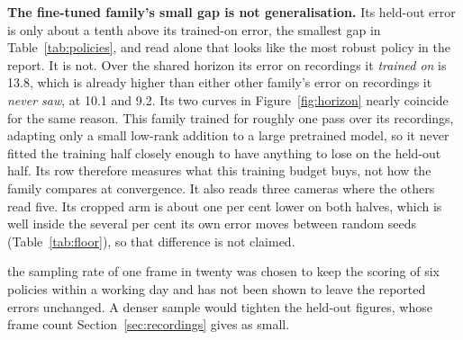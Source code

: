 \textbf{The fine-tuned family's small gap is not generalisation.} Its held-out
error is only about a tenth above its trained-on error, the smallest gap in
Table~\ref{tab:policies}, and read alone that looks like the most robust policy
in the report. It is not. Over the shared horizon its error on recordings it
\emph{trained on} is \num{13.8}, which is already higher than either other
family's error on recordings it \emph{never saw}, at \num{10.1} and \num{9.2}.
Its two curves in Figure~\ref{fig:horizon} nearly coincide for the same reason.
This family trained for roughly one pass over its recordings, adapting only a
small low-rank addition to a large pretrained model, so it never fitted the
training half closely enough to have anything to lose on the held-out half. Its
row therefore measures what this training budget buys, not how the family
compares at convergence. It also reads three cameras where the others read
five. Its cropped arm is about one per cent lower on both halves, which is
well inside the several per cent its own error moves between random seeds
(Table~\ref{tab:floor}), so that difference is not claimed.

\unjustified{} the sampling rate of one frame in twenty was chosen to keep the
scoring of six policies within a working day and has not been shown to leave
the reported errors unchanged. A denser sample would tighten the held-out
figures, whose frame count Section~\ref{sec:recordings} gives as small.
